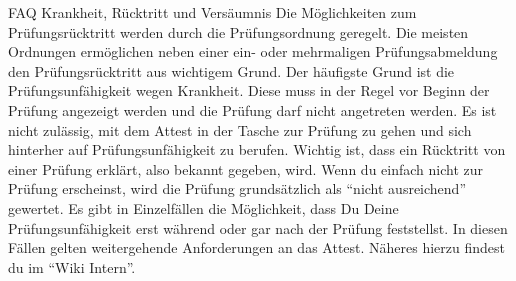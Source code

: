 \begin{artikel}{FAQ Krankheit, Rücktritt und Versäumnis}
Die Möglichkeiten zum Prüfungsrücktritt werden durch die Prüfungsordnung geregelt. Die meisten Ordnungen ermöglichen neben einer ein- oder mehrmaligen Prüfungsabmeldung den Prüfungsrücktritt aus wichtigem Grund. Der häufigste Grund ist die Prüfungsunfähigkeit wegen Krankheit. Diese muss in der Regel vor Beginn der Prüfung angezeigt werden und die Prüfung darf nicht angetreten werden. Es ist nicht zulässig, mit dem Attest in der Tasche zur Prüfung zu gehen und sich hinterher auf Prüfungsunfähigkeit zu berufen.
Wichtig ist, dass ein Rücktritt von einer Prüfung erklärt, also bekannt gegeben, wird. Wenn du einfach nicht zur Prüfung erscheinst, wird die Prüfung grundsätzlich als "`nicht ausreichend"' gewertet.
Es gibt in Einzelfällen die Möglichkeit, dass Du Deine Prüfungsunfähigkeit erst während oder gar nach der Prüfung feststellst. In diesen Fällen gelten weitergehende Anforderungen an das Attest. Näheres hierzu findest du im "`Wiki Intern"'.
\end{artikel}

